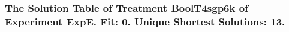  \begin{frame}
 \fontsize{8pt}{9pt}\selectfont
 \frametitle{ The Solution Table of Treatment BoolT4sgp6k of Experiment ExpE. Fit: 0. Unique Shortest Solutions: 13. }

 \label{ExpESolutionTable004.tex}  
 \end{frame}

